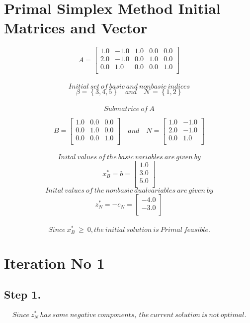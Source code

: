 \documentclass [12pt] {article}
\begin{document}
\section*{Primal Simplex Method Initial Matrices and Vector} 
\[
A  =
\begin{bmatrix}
1.0 & -1.0 & 1.0 & 0.0 & 0.0 \\ 2.0 & -1.0 & 0.0 & 1.0 & 0.0 \\ 0.0 & 1.0 & 0.0 & 0.0 & 1.0 \\ 
\end{bmatrix}
\]
\\
\[ Initial\ set\  of\  basic\  and\  nonbasic\  indices \]
\[
\beta= \left\{3, 4, 5\right\} \quad and \quad  \mathcal{N}=\left\{1, 2\right\}
\]
\\
\[
Submatrice\ of \ A
\]

\[
B =
\begin{bmatrix}
1.0 & 0.0 & 0.0 \\ 0.0 & 1.0 & 0.0 \\ 0.0 & 0.0 & 1.0 \\ 
\end{bmatrix} \quad and \quad
\mathit{N} =
\begin{bmatrix}
1.0 & -1.0 \\ 2.0 & -1.0 \\ 0.0 & 1.0 \\ 
\end{bmatrix}
\]
\\
\[
Inital\ values\ of\ the\ basic\ variables\ are\ given\ by
\]
\[
x_B^* = b =
\begin{bmatrix}
1.0 \\ 3.0 \\ 5.0 \\ 
\end{bmatrix}
\]
\[
Inital\ values\ of\ the\ nonbasic\ dual variables\ are\ given\ by
\]
\[
z_\mathit{N}^*= -c_\mathit{N} =
\begin{bmatrix}
-4.0 \\ -3.0 \\ 
\end{bmatrix}
\]
\\
\[
Since\ x_B^*\  \geq \  0, the\ initial\ solution\ is\ Primal\ feasible.
\]
\section*{Iteration No 1}
\subsection{Step 1.}
\[
Since\ z_\mathit{N}^*\ has\ some\ negative\ components,\ the\ current\ solution\ is\ not\ optimal.
\]
\end{document}

